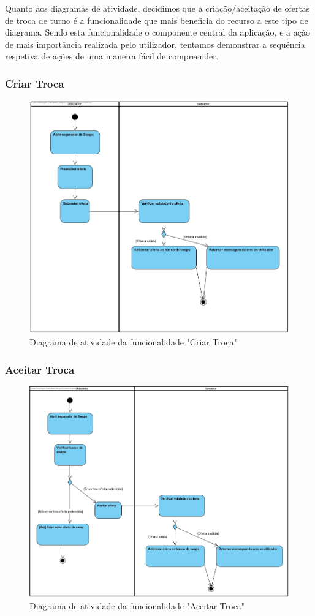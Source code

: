 \documentclass[a4paper]{article}
\begin{document}
Quanto aos diagramas de atividade, decidimos que a criação/aceitação de ofertas de troca de turno é a funcionalidade que mais beneficia do recurso a este tipo de diagrama. Sendo esta funcionalidade o componente central da aplicação, e a ação de mais importância realizada pelo utilizador, tentamos demonstrar a sequência respetiva de ações de uma maneira fácil de compreender.

\subsubsection{Criar Troca}
\begin{figure}[H]
\centering
\includegraphics[width=12cm]{AtividadeCriarTroca.jpg}
\caption{Diagrama de atividade da funcionalidade "Criar Troca"}
\label{}
\end{figure}

\subsubsection{Aceitar Troca}
\begin{figure}[H]
\centering
\includegraphics[width=12cm]{AtividadeAceitarTroca.jpg}
\caption{Diagrama de atividade da funcionalidade "Aceitar Troca"}
\label{}
\end{figure}
\end{document}
